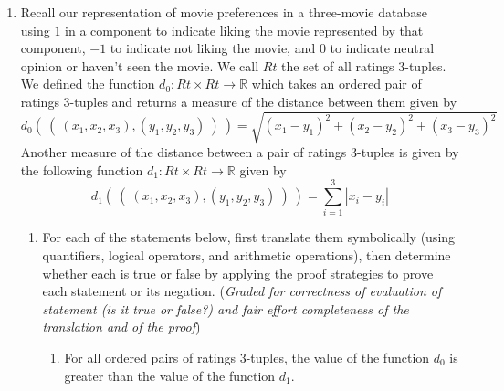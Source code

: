 \begin{enumerate}
\begin{enumerate}
   {\bf Solution}: A witness will be an ordered pair each of whose components is a subset of $\{1,2,3,4,5\}$
   and which make the property true. Consider $(X,Y) = (\{1,2\}, \{1,2,3\})$. This is an ordered 
   pair and since $1 \in \{1,2,3,4,5\}$, $2 \in \{1,2,3,4,5\}$, and $3 \in \{1,2,3,4,5\}$, 
   $X \subseteq \{1,2,3,4,5\}$ and $Y \subseteq \{1,2,3,4,5\}$ so $(X,Y) \in W \times W$.
   By definition of union, 
   \begin{align*}
    X \cup Y &= \{ a \mid a \in \{1,2\} \lor a \in \{1,2,3\} \} \\
        &=\{ a \mid a = 1 \lor a = 2 \lor a = 1 \lor a = 2 \lor a = 3 \} ~~ \text{by definition of roster method} \\
        &= \{ a \mid a = 1 \lor a = 2 \lor a = 3 \} ~~ \text{since $p \lor p \equiv p$} \\
        & = \{1,2,3\} = Y \qquad \text{by definition of roster method}
   \end{align*}
   \end{enumerate}
   

   \item Recall our representation of movie preferences in a three-movie database 
   using $1$ in a component to indicate liking the movie represented by that component, 
   $-1$ to indicate not liking the movie, and $0$ to indicate neutral opinion or
   haven't seen the movie. We call $Rt$ the set of all ratings $3$-tuples. 
   We defined the function 
   $d_0: Rt\times Rt \to \mathbb{R}$ which takes an ordered pair of ratings $3$-tuples and returns a measure
   of the distance between them 
   given by
   \[
   d_0 (~(~ (x_1, x_2, x_3), (y_1, y_2, y_3) ~) ~) = \sqrt{ (x_1 - y_1)^2 + (x_2 - y_2)^2 + (x_3 -y_3)^2}
   \]
   Another measure of the distance between a pair of ratings $3$-tuples is given by 
   the following function $d_1: Rt\times Rt \to \mathbb{R}$ given by 
   \[
   d_1 (~(~ (x_1, x_2, x_3), (y_1, y_2, y_3) ~) ~) = \sum_{i=1}^3 |x_i - y_i|
   \]
   \begin{enumerate}
    \item  For each of the statements below, first translate them symbolically (using
        quantifiers, logical operators, and arithmetic operations), then determine whether each 
        is true or false by applying the proof strategies to prove each statement or its negation.
        ({\it Graded for correctness of evaluation of statement (is it true or false?) and 
        fair effort completeness of the translation and of the proof}) 
        \begin{enumerate}
            \item For all ordered pairs of ratings $3$-tuples, the value of the function $d_0$ 
            is greater than the value of the function $d_1$.


\end{enumerate}
\end{enumerate}
\end{enumerate}

